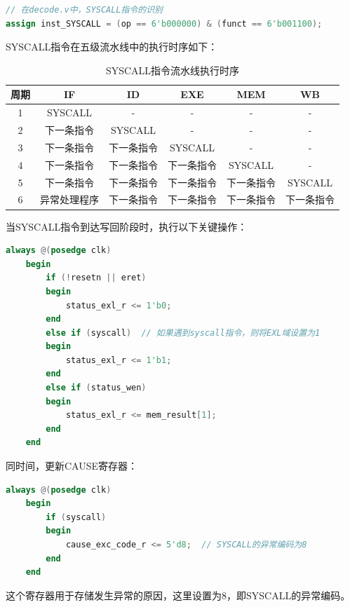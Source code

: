 \documentclass[a4paper]{article}
\begin{document}
\begin{lstlisting}[language=Verilog, caption=SYSCALL指令识别]
// 在decode.v中，SYSCALL指令的识别
assign inst_SYSCALL = (op == 6'b000000) & (funct == 6'b001100);
\end{lstlisting}

SYSCALL指令在五级流水线中的执行时序如下：

\begin{table}[H]
\centering
\caption{SYSCALL指令流水线执行时序}
\begin{tabular}{|c|c|c|c|c|c|}
\hline
\textbf{周期} & \textbf{IF} & \textbf{ID} & \textbf{EXE} & \textbf{MEM} & \textbf{WB} \\
\hline
1 & SYSCALL & - & - & - & - \\
\hline
2 & 下一条指令 & SYSCALL & - & - & - \\
\hline
3 & 下一条指令 & 下一条指令 & SYSCALL & - & - \\
\hline
4 & 下一条指令 & 下一条指令 & 下一条指令 & SYSCALL & - \\
\hline
5 & 下一条指令 & 下一条指令 & 下一条指令 & 下一条指令 & SYSCALL \\
\hline
6 & 异常处理程序 & 下一条指令 & 下一条指令 & 下一条指令 & 下一条指令 \\
\hline
\end{tabular}
\end{table}

当SYSCALL指令到达写回阶段时，执行以下关键操作：

\begin{lstlisting}[language=Verilog, caption=STATUS寄存器EXL域设置]
    always @(posedge clk)
    begin
        if (!resetn || eret)
        begin
            status_exl_r <= 1'b0;
        end
        else if (syscall)  // 如果遇到syscall指令，则将EXL域设置为1
        begin
            status_exl_r <= 1'b1;
        end
        else if (status_wen)
        begin
            status_exl_r <= mem_result[1];
        end
    end
    \end{lstlisting}

同时间，更新CAUSE寄存器：

\begin{lstlisting}[language=Verilog, caption=CAUSE寄存器异常编码设置]
    always @(posedge clk)
    begin
        if (syscall)
        begin
            cause_exc_code_r <= 5'd8;  // SYSCALL的异常编码为8
        end
    end
    \end{lstlisting}

这个寄存器用于存储发生异常的原因，这里设置为8，即SYSCALL的异常编码。
\end{document}
